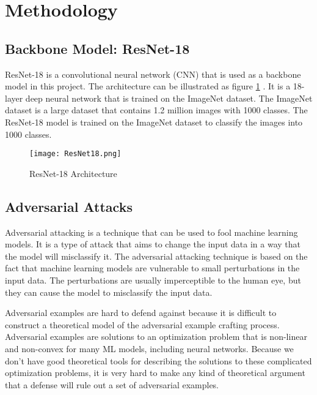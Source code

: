 \section{Methodology}

\subsection{Backbone Model: ResNet-18}


ResNet-18 is a convolutional neural network (CNN) that is used as a backbone model in this project. The architecture can be illustrated as figure \ref{fig:resnet18} \cite{ResNet-18}.
It is a 18-layer deep neural network that is trained on the ImageNet dataset. The ImageNet dataset is a large dataset that contains 1.2 million images with 1000 classes. The ResNet-18 model is trained on the ImageNet dataset to classify the images into 1000 classes.


\begin{figure}[h]
\centering
\texttt{[image: ResNet18.png]}
\caption{ResNet-18 Architecture}
\label{fig:resnet18}
\end{figure}

\subsection{Adversarial Attacks}


Adversarial attacking is a technique that can be used to fool machine learning models. It is a type of attack that aims to change the input data in a way that the model will misclassify it. The adversarial attacking technique is based on the fact that machine learning models are vulnerable to small perturbations in the input data. The perturbations are usually imperceptible to the human eye, but they can cause the model to misclassify the input data.

Adversarial examples are hard to defend against because it is difficult to construct a theoretical model of the adversarial example crafting process. Adversarial examples are solutions to an optimization problem that is non-linear and non-convex for many ML models, including neural networks. Because we don't have good theoretical tools for describing the solutions to these complicated optimization problems, it is very hard to make any kind of theoretical argument that a defense will rule out a set of adversarial examples.

